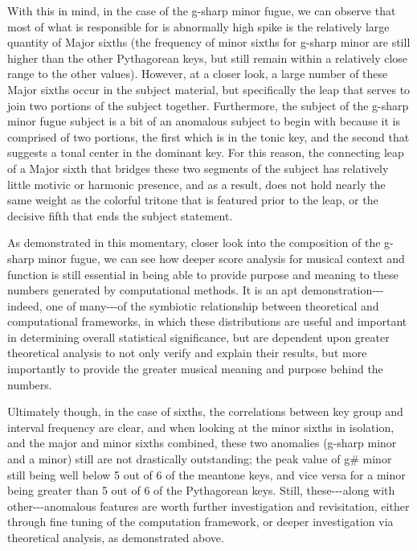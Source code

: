 With this in mind, in the case of the g-sharp minor fugue, we can
observe that most of what is responsible for is abnormally high spike is
the relatively large quantity of Major sixths (the frequency of minor
sixths for g-sharp minor are still higher than the other Pythagorean
keys, but still remain within a relatively close range to the other
values). However, at a closer look, a large number of these Major sixths
occur in the subject material, but specifically the leap that serves to
join two portions of the subject together. Furthermore, the subject of
the g-sharp minor fugue subject is a bit of an anomalous subject to
begin with because it is comprised of two portions, the first which is
in the tonic key, and the second that suggests a tonal center in the
dominant key. For this reason, the connecting leap of a Major sixth that
bridges these two segments of the subject has relatively little motivic
or harmonic presence, and as a result, does not hold nearly the same
weight as the colorful tritone that is featured prior to the leap, or
the decisive fifth that ends the subject statement.


    \begin{center}
    \end{center}
    


    \begin{center}
    \end{center}
    
    As demonstrated in this momentary, closer look into the composition of
the g-sharp minor fugue, we can see how deeper score analysis for
musical context and function is still essential in being able to provide
purpose and meaning to these numbers generated by computational methods.
It is an apt demonstration-\/-\/-indeed, one of many-\/-\/-of the
symbiotic relationship between theoretical and computational frameworks,
in which these distributions are useful and important in determining
overall statistical significance, but are dependent upon greater
theoretical analysis to not only verify and explain their results, but
more importantly to provide the greater musical meaning and purpose
behind the numbers.

Ultimately though, in the case of sixths, the correlations between key
group and interval frequency are clear, and when looking at the minor
sixths in isolation, and the major and minor sixths combined, these two
anomalies (g-sharp minor and a minor) still are not drastically
outstanding; the peak value of g\# minor still being well below 5 out of
6 of the meantone keys, and vice versa for a minor being greater than 5
out of 6 of the Pythagorean keys. Still, these-\/-\/-along with
other-\/-\/-anomalous features are worth further investigation and
revisitation, either through fine tuning of the computation framework,
or deeper investigation via theoretical analysis, as demonstrated above.

